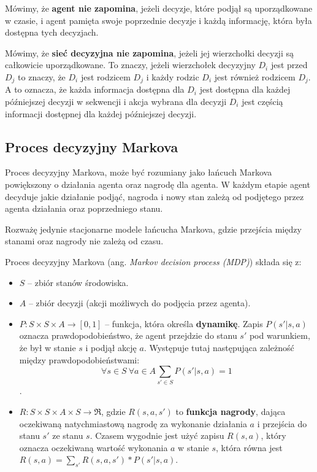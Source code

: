 \documentclass[a4paper, 12pt,oneside]{book}
\begin{document}
Mówimy, że \textbf{agent nie zapomina}, jeżeli decyzje, które podjął są
uporządkowane w czasie, i agent pamięta swoje poprzednie decyzje i każdą
informację, która była dostępna tych decyzjach.

Mówimy, że \textbf{sieć decyzyjna nie zapomina}, jeżeli jej wierzchołki decyzji
są całkowicie uporządkowane. To znaczy, jeżeli wierzchołek decyzyjny $D_i$ jest
przed $D_j$ to znaczy, że $D_i$ jest rodzicem $D_j$ i każdy rodzic $D_i$ jest
również rodzicem $D_j$. A to oznacza, że każda informacja dostępna dla $D_i$
jest dostępna dla każdej późniejszej decyzji w sekwencji i akcja wybrana dla
decyzji $D_i$ jest częścią informacji dostępnej dla każdej późniejszej decyzji.

\subsection{Proces decyzyjny Markova}
Proces decyzyjny Markova, może być rozumiany jako łańcuch Markova powiększony o
działania agenta oraz nagrodę dla agenta. W każdym etapie agent decyduje jakie
działanie podjąć, nagroda i nowy stan zależą od podjętego przez agenta
działania oraz poprzedniego stanu. 

Rozważę jedynie stacjonarne modele łańcucha Markova, gdzie przejścia między
stanami oraz nagrody nie zależą od czasu. 

Proces decyzyjny Markova (ang. \textit{Markov decision process (MDP)}) składa
się z:
\begin{itemize}
		\setlength\itemsep{-0.4em}
	\item $S$ -- zbiór stanów środowiska.
	\item $A$ -- zbiór decyzji (akcji możliwych do podjęcia przez agenta).
	\item $P: S\times S\times A\rightarrow [0,1]$ -- funkcja, która określa
		\textbf{dynamikę}. Zapis $P(s' | s, a)$ oznacza
		prawdopodobieństwo, że agent przejdzie do stanu $s'$ pod
		warunkiem, że był w stanie $s$ i podjął akcję $a$. Występuje
		tutaj następująca zależność między prawdopodobieństwami:
		\[\forall s\in S \ \forall a\in A \sum_{s' \in S}P(s'|s,a)=1\].
	\item $R:S\times S\times A\times S \rightarrow \mathfrak{R}$, gdzie
		$R(s,a,s')$ to \textbf{funkcja nagrody}, dająca oczekiwaną
		natychmiastową nagrodę za wykonanie działania $a$ i przejścia
		do stanu $s'$ ze stanu $s$. Czasem wygodnie jest użyć zapisu
		$R(s,a)$, który oznacza oczekiwaną wartość wykonania $a$ w
		stanie $s$, która równa jest
		$R(s,a)=\sum _{s'}R(s,a,s') * P(s'|s,a)$.
\end{itemize}
\end{document}
